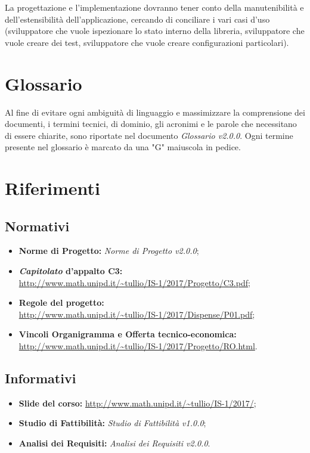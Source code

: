 \documentclass[../PianodiProgetto.tex]{subfiles}
\begin{document}
	\noindent La progettazione e l'implementazione dovranno tener conto della manutenibilità e dell'estensibilità dell'applicazione, cercando di conciliare i vari casi d'uso (sviluppatore che vuole ispezionare lo stato interno della libreria, sviluppatore che vuole creare dei test, sviluppatore che vuole creare configurazioni particolari). 
	
	\section{Glossario}
	Al fine di evitare ogni ambiguità di linguaggio e massimizzare la comprensione dei documenti, i termini tecnici, di dominio, gli acronimi e le parole che necessitano di essere chiarite, sono riportate nel documento \textit{Glossario v2.0.0}. Ogni termine presente nel glossario è marcato da una "G" maiuscola in pedice.
	
	\section{Riferimenti}
	
	\subsection*{Normativi}
	\begin{itemize}
		\item \textbf{Norme di Progetto:} \textit{Norme di Progetto v2.0.0};
		\item \textbf{\textit{Capitolato} d'appalto C3:}\\ \url{http://www.math.unipd.it/~tullio/IS-1/2017/Progetto/C3.pdf};
		\item \textbf{Regole del progetto:}\\ \url{http://www.math.unipd.it/~tullio/IS-1/2017/Dispense/P01.pdf};
		\item \textbf{Vincoli Organigramma e Offerta tecnico-economica:}\\ \url{http://www.math.unipd.it/~tullio/IS-1/2017/Progetto/RO.html}.
	\end{itemize}
	
	\subsection*{Informativi}
	\begin{itemize}
		\item \textbf{Slide del corso:} \url{http://www.math.unipd.it/~tullio/IS-1/2017/};
		\item \textbf{Studio di Fattibilità:} \textit{Studio di Fattibilità v1.0.0};
		\item \textbf{Analisi dei Requisiti:} \textit{Analisi dei Requisiti v2.0.0}.
	\end{itemize}
	
\end{document}
